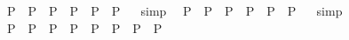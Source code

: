\begin{isabellebody}
\ {\isachardoublequoteopen}{\isacharparenleft}{\isasymphi}\isactrlsup P{\isacharparenright}\ \isactrlbold {\isasymand}\ {\isacharparenleft}{\isasympsi}\isactrlsup P{\isacharparenright}\ \isactrlbold {\isasymrightarrow}\ {\isacharparenleft}{\isasymchi}\isactrlsup P{\isacharparenright}\ {\isasymequiv}\ {\isacharparenleft}{\isacharparenleft}{\isasymphi}\isactrlsup P{\isacharparenright}\ \isactrlbold {\isasymand}\ {\isacharparenleft}{\isasympsi}\isactrlsup P{\isacharparenright}{\isacharparenright}\ \isactrlbold {\isasymrightarrow}\ {\isacharparenleft}{\isasymchi}\isactrlsup P{\isacharparenright}{\isachardoublequoteclose}%
\isadelimproof
\ %
\endisadelimproof
%
\isatagproof
{}\isamarkupfalse%
\ simp\ \isamarkupfalse%
%
\endisatagproof
{\isafoldproof}%
%
\isadelimproof
%
\endisadelimproof
\isanewline
{}\isamarkupfalse%
\ {\isachardoublequoteopen}{\isacharparenleft}{\isasymphi}\isactrlsup P{\isacharparenright}\ \isactrlbold {\isasymand}\ {\isacharparenleft}{\isasympsi}\isactrlsup P{\isacharparenright}\ \isactrlbold {\isasymrightarrow}\ {\isacharparenleft}{\isasymchi}\isactrlsup P{\isacharparenright}\ {\isasymequiv}\ {\isacharparenleft}{\isasymphi}\isactrlsup P{\isacharparenright}\ \isactrlbold {\isasymand}\ {\isacharparenleft}{\isacharparenleft}{\isasympsi}\isactrlsup P{\isacharparenright}\ \isactrlbold {\isasymrightarrow}\ {\isacharparenleft}{\isasymchi}\isactrlsup P{\isacharparenright}{\isacharparenright}{\isachardoublequoteclose}%
\isadelimproof
\ %
\endisadelimproof
%
\isatagproof
{}\isamarkupfalse%
\ simp%
\endisatagproof
{\isafoldproof}%
%
\isadelimproof
%
\endisadelimproof
\ \isamarkupfalse%
%
\isadelimproof
\ %
\endisadelimproof
%
\isatagproof
{}\isamarkupfalse%
\ %
%
\endisatagproof
{\isafoldproof}%
%
\isadelimproof
%
\endisadelimproof
\isanewline
\isanewline
{}\isamarkupfalse%
\ {\isachardoublequoteopen}{\isacharparenleft}{\isacharparenleft}{\isasymphi}\isactrlsup P{\isacharparenright}\ \isactrlbold {\isasymand}\ {\isacharparenleft}{\isasympsi}\isactrlsup P{\isacharparenright}\ \isactrlbold {\isasymequiv}\ {\isacharparenleft}{\isasymphi}\isactrlsup P{\isacharparenright}\ \isactrlbold {\isasymand}\ {\isacharparenleft}{\isasympsi}\isactrlsup P{\isacharparenright}{\isacharparenright}\ {\isasymequiv}\ {\isacharparenleft}{\isacharparenleft}{\isacharparenleft}{\isasymphi}\isactrlsup P{\isacharparenright}\ \isactrlbold {\isasymand}\ {\isacharparenleft}{\isasympsi}\isactrlsup P{\isacharparenright}{\isacharparenright}\ \isactrlbold {\isasymequiv}\ {\isacharparenleft}{\isacharparenleft}{\isasymphi}\isactrlsup P{\isacharparenright}\ \isactrlbold {\isasymand}\ {\isacharparenleft}{\isasympsi}\isactrlsup P{\isacharparenright}{\isacharparenright}{\isacharparenright}{\isachardoublequoteclose}%

\end{isabellebody}

